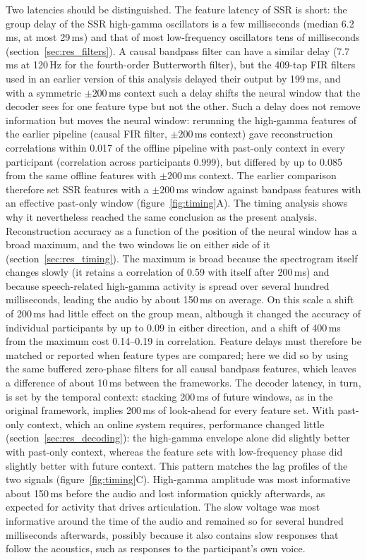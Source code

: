 \documentclass{iopjournal}
\begin{document}
Two latencies should be distinguished. The feature latency of SSR is short: the group delay of the SSR high-gamma oscillators is a few milliseconds (median 6.2\,ms, at most 29\,ms) and that of most low-frequency oscillators tens of milliseconds (section~\ref{sec:res_filters}). A causal bandpass filter can have a similar delay (7.7\,ms at 120\,Hz for the fourth-order Butterworth filter), but the 409-tap FIR filters used in an earlier version of this analysis delayed their output by 199\,ms, and with a symmetric $\pm200$\,ms context such a delay shifts the neural window that the decoder sees for one feature type but not the other. Such a delay does not remove information but moves the neural window: rerunning the high-gamma features of the earlier pipeline (causal FIR filter, $\pm200$\,ms context) gave reconstruction correlations within 0.017 of the offline pipeline with past-only context in every participant (correlation across participants 0.999), but differed by up to 0.085 from the same offline features with $\pm200$\,ms context. The earlier comparison therefore set SSR features with a $\pm200$\,ms window against bandpass features with an effective past-only window (figure~\ref{fig:timing}A). The timing analysis shows why it nevertheless reached the same conclusion as the present analysis. Reconstruction accuracy as a function of the position of the neural window has a broad maximum, and the two windows lie on either side of it (section~\ref{sec:res_timing}). The maximum is broad because the spectrogram itself changes slowly (it retains a correlation of 0.59 with itself after 200\,ms) and because speech-related high-gamma activity is spread over several hundred milliseconds, leading the audio by about 150\,ms on average. On this scale a shift of 200\,ms had little effect on the group mean, although it changed the accuracy of individual participants by up to 0.09 in either direction, and a shift of 400\,ms from the maximum cost 0.14--0.19 in correlation. Feature delays must therefore be matched or reported when feature types are compared; here we did so by using the same buffered zero-phase filters for all causal bandpass features, which leaves a difference of about 10\,ms between the frameworks. The decoder latency, in turn, is set by the temporal context: stacking 200\,ms of future windows, as in the original framework, implies 200\,ms of look-ahead for every feature set. With past-only context, which an online system requires, performance changed little (section~\ref{sec:res_decoding}): the high-gamma envelope alone did slightly better with past-only context, whereas the feature sets with low-frequency phase did slightly better with future context. This pattern matches the lag profiles of the two signals (figure~\ref{fig:timing}C). High-gamma amplitude was most informative about 150\,ms before the audio and lost information quickly afterwards, as expected for activity that drives articulation. The slow voltage was most informative around the time of the audio and remained so for several hundred milliseconds afterwards, possibly because it also contains slow responses that follow the acoustics, such as responses to the participant's own voice.
\end{document}
